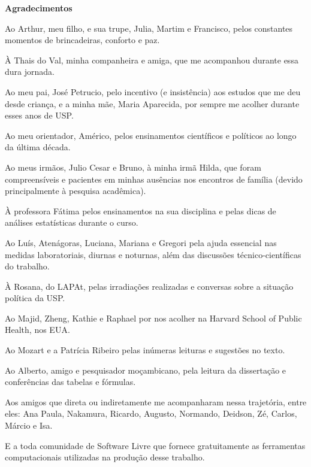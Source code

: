 \newpage

\begin{center}
  \textbf{Agradecimentos} 
\end{center}

Ao Arthur, meu filho, e sua trupe, Julia, Martim e Francisco, pelos 
constantes momentos de brincadeiras, conforto e paz.

À Thais do Val, minha companheira e amiga, que me acompanhou durante  
essa dura jornada.  

Ao meu pai, José Petrucio, pelo incentivo (e insistência) aos estudos que me deu desde criança, e a minha mãe, Maria Aparecida, por sempre me acolher durante esses anos de USP. 

Ao meu orientador, Américo, pelos ensinamentos científicos e políticos ao longo da última década. 

Ao meus irmãos, Julio Cesar e Bruno, à minha irmã Hilda, que foram compreensíveis e pacientes em minhas ausências nos encontros de família (devido principalmente à pesquisa acadêmica).  

À professora Fátima pelos ensinamentos na sua disciplina e pelas dicas de  
análises estatísticas durante o curso. 

Ao Luís, Atenágoras, Luciana, Mariana e Gregori pela ajuda essencial nas medidas laboratoriais, diurnas e noturnas, além das discussões técnico-científicas do trabalho. 

À Rosana, do LAPAt, pelas irradiações realizadas e conversas sobre a situação 
política da USP.  

Ao Majid, Zheng, Kathie e Raphael por nos acolher na Harvard School of Public 
Health, nos EUA.

Ao Mozart e a Patrícia Ribeiro pelas inúmeras leituras e sugestões no texto. 

Ao Alberto, amigo e pesquisador moçambicano, pela leitura da dissertação e conferências das tabelas e fórmulas. 

Aos amigos que direta ou indiretamente me acompanharam nessa trajetória, entre eles: 
Ana Paula, Nakamura, Ricardo, Augusto, Normando, Deidson, Zé, Carlos, Márcio e Isa.

E a toda comunidade de Software Livre que fornece gratuitamente as ferramentas computacionais utilizadas na produção desse trabalho. 
